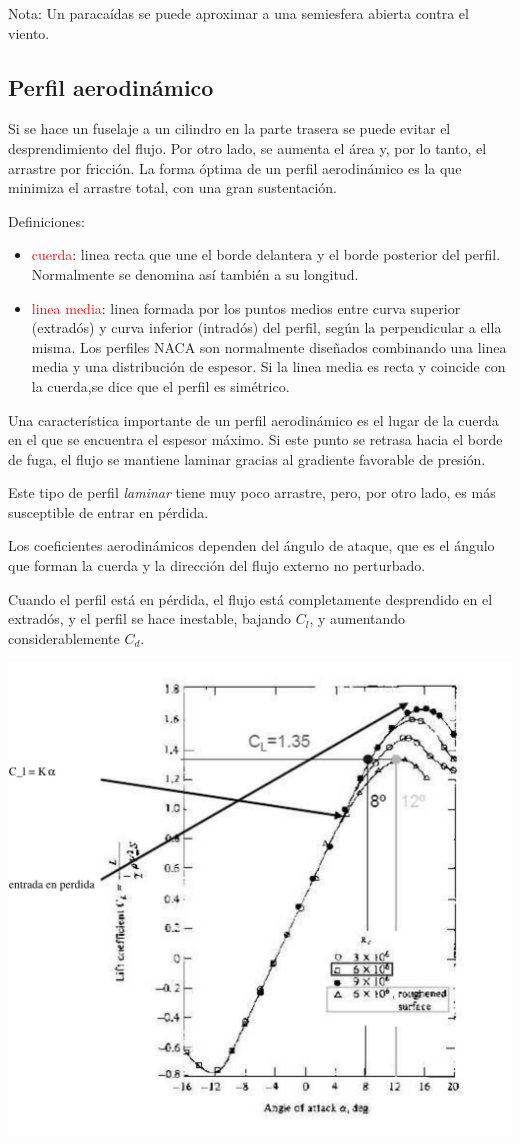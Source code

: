 		Nota: Un paracaídas se puede aproximar a una semiesfera abierta contra
		el viento. 


\subsection{Perfil aerodinámico}

	
	Si se hace un fuselaje a un cilindro en la parte trasera se puede
	evitar el desprendimiento del flujo. Por otro lado, se aumenta el
	área y, por lo tanto, el arrastre por fricción. La forma óptima de
	un perfil aerodinámico es la que minimiza el arrastre total, con una
	gran sustentación.
	
	Definiciones: 
	\begin{itemize}
		\item \textcolor{red}{cuerda}: linea recta que une el borde delantera y
		el borde posterior del perfil. Normalmente se denomina así también
		a su longitud. 
		\item \textcolor{red}{linea media}: linea formada por los puntos medios
		entre curva superior (extradós) y curva inferior (intradós) del perfil,
		según la perpendicular a ella misma. Los perfiles NACA son normalmente
		diseñados combinando una linea media y una distribución de espesor.
		Si la linea media es recta y coincide con la cuerda,se dice que el
		perfil es simétrico. 
	\end{itemize}

	
	Una característica importante de un perfil aerodinámico es el lugar
	de la cuerda en el que se encuentra el espesor máximo. Si este punto
	se retrasa hacia el borde de fuga, el flujo se mantiene laminar gracias
	al gradiente favorable de presión.
	
	Este tipo de perfil  \textit{laminar} tiene muy
	poco arrastre, pero, por otro lado, es más susceptible de entrar en
	pérdida.
	
	Los coeficientes aerodinámicos dependen del ángulo de ataque, que
	es el ángulo que forman la cuerda y la dirección del flujo externo
	no perturbado.
	
	Cuando el perfil está en pérdida, el flujo está completamente desprendido
	en el extradós, y el perfil se hace inestable, bajando $C_{l}$, y
	aumentando considerablemente $C_{d}$. 

\begin{center}
	\includegraphics[width=0.6\linewidth]{TeX_files/chapter09-Externo/cl}
\end{center}


